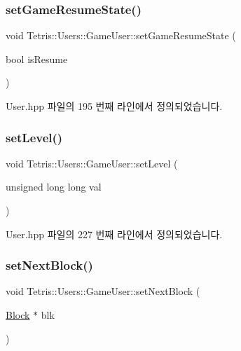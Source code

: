\subsubsection{\texorpdfstring{set\+Game\+Resume\+State()}{setGameResumeState()}}
{\footnotesize\ttfamily void Tetris\+::\+Users\+::\+Game\+User\+::set\+Game\+Resume\+State (\begin{DoxyParamCaption}\item[{bool}]{is\+Resume }\end{DoxyParamCaption})\hspace{0.3cm}{\ttfamily [inline]}}



User.\+hpp 파일의 195 번째 라인에서 정의되었습니다.

\mbox{\label{class_tetris_1_1_users_1_1_game_user_a40603ad69564036b53b99cdd67fe5451}} 
\subsubsection{\texorpdfstring{set\+Level()}{setLevel()}}
{\footnotesize\ttfamily void Tetris\+::\+Users\+::\+Game\+User\+::set\+Level (\begin{DoxyParamCaption}\item[{unsigned long long}]{val }\end{DoxyParamCaption})\hspace{0.3cm}{\ttfamily [inline]}}



User.\+hpp 파일의 227 번째 라인에서 정의되었습니다.

\mbox{\label{class_tetris_1_1_users_1_1_game_user_a6249d0f4e9d77edd94935a74bbd298d5}} 
\subsubsection{\texorpdfstring{set\+Next\+Block()}{setNextBlock()}\hspace{0.1cm}{\footnotesize\ttfamily [1/2]}}
{\footnotesize\ttfamily void Tetris\+::\+Users\+::\+Game\+User\+::set\+Next\+Block (\begin{DoxyParamCaption}\item[{\hyperlink{class_tetris_1_1_block}{Block} $\ast$}]{blk }\end{DoxyParamCaption})}




